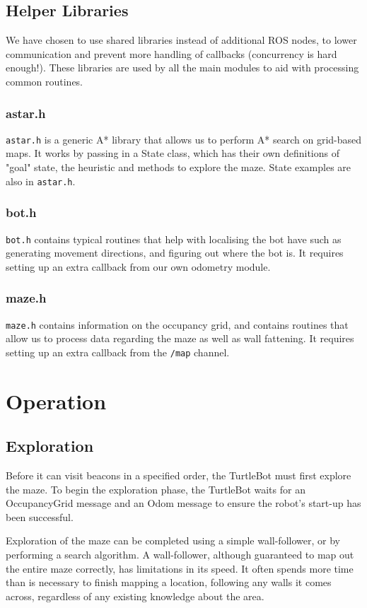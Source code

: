 \documentclass[titlepage,12pt,a4paper]{article}
\begin{document}
\subsection{Helper Libraries}
We have chosen to use shared libraries instead of additional ROS nodes, to lower communication and prevent more handling of callbacks (concurrency is hard enough!). These libraries are used by all the main modules to aid with processing common routines.

\subsubsection{astar.h}
\verb|astar.h| is a generic A* library that allows us to perform A* search on grid-based maps. It works by passing in a State class, which has their own definitions of "goal" state, the heuristic and methods to explore the maze. State examples are also in \verb|astar.h|.

\subsubsection{bot.h}
\verb|bot.h| contains typical routines that help with localising the bot have such as generating movement directions, and figuring out where the bot is. It requires setting up an extra callback from our own odometry module.

\subsubsection{maze.h}
\verb|maze.h| contains information on the occupancy grid, and contains routines that allow us to process data regarding the maze as well as wall fattening. It requires setting up an extra callback from the \verb|/map| channel.

\pagebreak
\section{Operation}
\subsection{Exploration}
Before it can visit beacons in a specified order, the TurtleBot must first explore the maze. To begin the exploration phase, the TurtleBot waits for an OccupancyGrid message and an Odom message to ensure the robot's start-up has been successful. 

Exploration of the maze can be completed using a simple wall-follower, or by performing a search algorithm. A wall-follower, although guaranteed to map out the entire maze correctly, has limitations in its speed. It often spends more time than is necessary to finish mapping a location, following any walls it comes across, regardless of any existing knowledge about the area.
\end{document}
